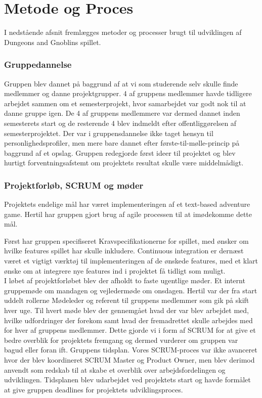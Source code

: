 \newpage

\section{Metode og Proces}
I nedstående afsnit fremlægges metoder og processer brugt til udviklingen af
Dungeons and Gnoblins spillet.

\subsubsection{Gruppedannelse}
Gruppen blev dannet på baggrund af at vi som studerende selv skulle finde medlemmer og danne projektgrupper. 4 af gruppens medlemmer havde tidligere arbejdet sammen om et semesterprojekt, hvor samarbejdet var godt nok til at danne gruppe igen. De 4 af gruppens medlemmere var dermed dannet inden semesterets start og de resterende 4 blev indmeldt efter offentliggørelsen af semesterprojektet. Der var i gruppensdannelse ikke taget hensyn til personlighedsprofiler, men mere bare dannet efter første-til-mølle-princip på baggrund af et opslag. Gruppen redegjorde først ideer til projektet og blev hurtigt forventningsafstemt om projektets resultat skulle være middelmådigt. 

\subsubsection{Projektforløb, SCRUM og møder}
Projektets endelige mål har været implementeringen af et text-based adventure game.
Hertil har gruppen gjort brug af agile processen til at imødekomme dette mål.

Først har gruppen specifiseret Kravspecifikationerne for spillet, med ønsker om
hvilke features spillet har skulle inkludere. Continuous integration er dernæst
været et vigtigt værktøj til implementeringen af de ønskede features, med et klart
ønske om at integrere nye features ind i projektet få tidligt som muligt.\\

I løbet af projektforløbet blev der afholdt to faste ugentlige møder. Et internt gruppemøde om mandagen og vejledermøde om onsdagen. Hertil var der fra start uddelt rollerne Mødeleder og referent til gruppens medlemmer som gik på skift hver uge. Til hvert møde blev der gennemgået hvad der var blev arbejdet med, hvilke udfordringer der forekom samt hvad der fremadrettet skulle arbejdes med for hver af gruppens medlemmer. Dette gjorde vi i form af SCRUM for at give et bedre overblik for projektets fremgang og dermed vurderer om gruppen var bagud eller foran ift. Gruppens tidsplan. Vores SCRUM-proces var ikke avanceret hvor der blev koordineret SCRUM Master og Product Owner, men blev derimod anvendt som redskab til at skabe et overblik over arbejdsfordelingen og udviklingen. Tidsplanen blev udarbejdet ved projektets start og havde formålet at give gruppen deadlines for projektets udviklingsproces. 

